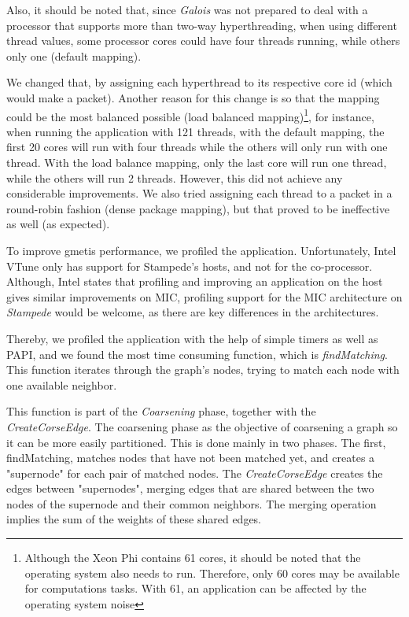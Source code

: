 \documentclass[abstract=on,9pt,twocolumn]{scrartcl}
\begin{document}
Also, it should be noted that, since \textit{Galois} was not prepared to
deal with a processor that supports more than two-way hyperthreading,
when using different thread values, some processor cores could have four
threads running, while others only one (default mapping).

We changed that, by assigning each hyperthread to its respective core id
(which would make a packet).  Another reason for this change is so that
the mapping could be the most balanced possible (load balanced
mapping)\footnote{Although the Xeon Phi contains 61 cores, it should be
  noted that the operating system also needs to run. Therefore, only 60
cores may be available for computations tasks. With 61, an application
can be affected by the operating system noise}, for instance, when
running the application with 121 threads, with the default mapping, the
first 20 cores will run with four threads while the others will only run
with one thread. With the load balance mapping, only the last core will
run one thread, while the others will run 2 threads. However, this did
not achieve any considerable improvements. We also tried assigning each
thread to a packet in a round-robin fashion (dense package mapping), but
that proved to be ineffective as well (as expected).

To improve gmetis performance, we profiled the application.
Unfortunately, Intel VTune only has support for Stampede's hosts, and
not for the co-processor. Although, Intel states that profiling and
improving an application on the host gives similar improvements on MIC,
profiling support for the MIC architecture on \textit{Stampede} would be
welcome, as there are key differences in the architectures.

Thereby, we profiled the application with the help of simple timers as
well as PAPI, and we found the most time consuming function, which is
\textit{findMatching}. This function iterates through the graph's nodes,
trying to match each node with one available neighbor.

This function is part of the \textit{Coarsening} phase, together with
the \textit{CreateCorseEdge}.
The coarsening phase as the objective of coarsening a graph so it can be
more easily partitioned. This is done mainly in two phases. The first,
findMatching, matches nodes that have not been matched yet, and creates
a "supernode" for each pair of matched nodes. The
\textit{CreateCorseEdge} creates the edges between "supernodes", merging
edges that are shared between the two nodes of the supernode and their
common neighbors. The merging operation implies the sum of the weights
of these shared edges.
\end{document}
